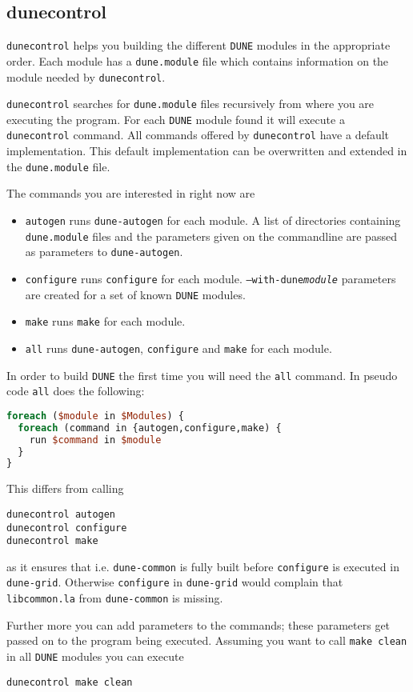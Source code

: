 \documentclass[11pt,a4paper,headinclude,footinclude,DIV16,normalheadings]{scrartcl}
\newcommand{\dune}{\texttt{DUNE}\xspace}
\newcommand{\autogen}{\texttt{dune-autogen}\xspace}
\newcommand{\configure}{\texttt{configure}\xspace}
\newcommand{\dunecommon}{\texttt{dune-common}\xspace}
\newcommand{\dunegrid}{\texttt{dune-grid}\xspace}
\newcommand{\dunecontrol}{\texttt{dunecontrol}\xspace}
\newcommand{\dunemodule}{\texttt{dune.module}\xspace}
\newcommand{\make}{\texttt{make}\xspace}
\begin{document}
\subsection{dunecontrol}
\label{dunecontrol}
\dunecontrol helps you building the different \dune modules in the
appropriate order. Each module has a \dunemodule file which contains
information on the module needed by \dunecontrol. 

\dunecontrol searches for \dunemodule files recursively from where you
are executing the program. For each \dune module found it will execute
a \dunecontrol command. All commands offered by \dunecontrol have a
default implementation. This default implementation can be overwritten
and extended in the \dunemodule file.

The commands you are interested in right now are
\begin{itemize}
\item \texttt{autogen} runs \autogen for each module. A list of
  directories containing \dunemodule files and the parameters given on
  the commandline are passed as parameters to \autogen.
\item \texttt{configure} runs \configure for each
  module. \texttt{--with-dune\textit{module}} parameters are created
  for a set of known \dune modules.
\item \texttt{make} runs \make for each module.
\item \texttt{all} runs \autogen, \configure and \make for each module.
\end{itemize}

In order to build \dune the first time you will need the \texttt{all}
command. In pseudo code \texttt{all} does the following:
\begin{lstlisting}[language=Perl]
foreach ($module in $Modules) {
  foreach (command in {autogen,configure,make) {
    run $command in $module
  }
}
\end{lstlisting}

This differs from calling
\begin{lstlisting}
dunecontrol autogen
dunecontrol configure
dunecontrol make
\end{lstlisting}
as it ensures that i.e. \dunecommon is fully built before \configure
is executed in \dunegrid. Otherwise \configure in \dunegrid would
complain that \texttt{libcommon.la} from \dunecommon is missing.

Further more you can add parameters to the commands; these parameters
get passed on to the program being executed. Assuming you want to call
\texttt{make clean} in all \dune modules you can execute
\begin{lstlisting}
dunecontrol make clean
\end{lstlisting}
\end{document}

